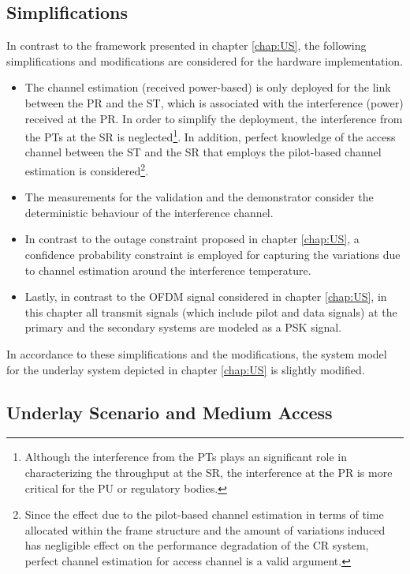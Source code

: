 \subsection{Simplifications}
\label{ssec:simp1}
In contrast to the framework presented in chapter \ref{chap:US}, the following simplifications and modifications are considered for the hardware implementation.
\begin{itemize}
\item The channel estimation (received power-based) is only deployed for the link between the PR and the ST, which is associated with the interference (power) received at the PR. In order to simplify the deployment, the interference from the PTs at the SR is neglected\footnote{Although the interference from the PTs plays an significant role in characterizing the throughput at the SR, the interference at the PR is more critical for the PU or regulatory bodies.}. In addition, perfect knowledge of the access channel between the ST and the SR that employs the pilot-based channel estimation is considered\footnote{Since the effect due to the pilot-based channel estimation in terms of time allocated within the frame structure and the amount of variations induced has negligible effect on the performance degradation of the CR system, perfect channel estimation for access channel is a valid argument.}.  
\item The measurements for the validation and the demonstrator consider the deterministic behaviour of the interference channel.  
\item In contrast to the outage constraint proposed in chapter \ref{chap:US}, a confidence probability constraint is employed for capturing the variations due to channel estimation around the interference temperature. %
\item Lastly, in contrast to the OFDM signal considered in chapter \ref{chap:US}, in this chapter all transmit signals (which include pilot and data signals) at the primary and the secondary systems are modeled as a PSK signal. 
\end{itemize}

In accordance to these simplifications and the modifications, the system model for the underlay system depicted in chapter \ref{chap:US} is slightly modified. 

\subsection{Underlay Scenario and Medium Access}
\label{scenario}

